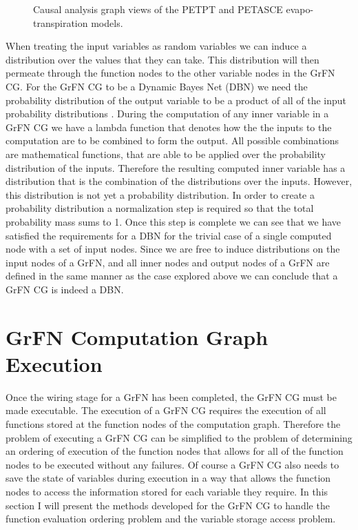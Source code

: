 \FloatBarrier
\begin{figure}[!tbp]
  \centering

  \caption[GrFN Causal Analysis Graph Examples]{Causal analysis graph views of the PETPT and PETASCE evapo-transpiration models.}
\end{figure}
\FloatBarrier

When treating the input variables as random variables we can induce a distribution over the values that they can take.
This distribution will then permeate through the function nodes to the other variable nodes in the GrFN CG.
For the GrFN CG to be a Dynamic Bayes Net (DBN) we need the probability distribution of the output variable to be a product of all of the input probability distributions \citep{pearl2009causality}.
During the computation of any inner variable in a GrFN CG we have a lambda function that denotes how the the inputs to the computation are to be combined to form the output.
All possible combinations are mathematical functions, that are able to be applied over the probability distribution of the inputs.
Therefore the resulting computed inner variable has a distribution that is the combination of the distributions over the inputs.
However, this distribution is not yet a probability distribution.
In order to create a probability distribution a normalization step is required so that the total probability mass sums to 1.
Once this step is complete we can see that we have satisfied the requirements for a DBN for the trivial case of a single computed node with a set of input nodes.
Since we are free to induce distributions on the input nodes of a GrFN, and all inner nodes and output nodes of a GrFN are defined in the same manner as the case explored above we can conclude that a GrFN CG is indeed a DBN.

\section{GrFN Computation Graph Execution\label{sec:cg_execution}}
Once the wiring stage for a GrFN has been completed, the GrFN CG must be made executable. The execution of a GrFN CG requires the execution of all functions stored at the function nodes of the computation graph. Therefore the problem of executing a GrFN CG can be simplified to the problem of determining an ordering of execution of the function nodes that allows for all of the function nodes to be executed without any failures. Of course a GrFN CG also needs to save the state of variables during execution in a way that allows the function nodes to access the information stored for each variable they require. In this section I will present the methods developed for the GrFN CG to handle the function evaluation ordering problem and the variable storage access problem.

